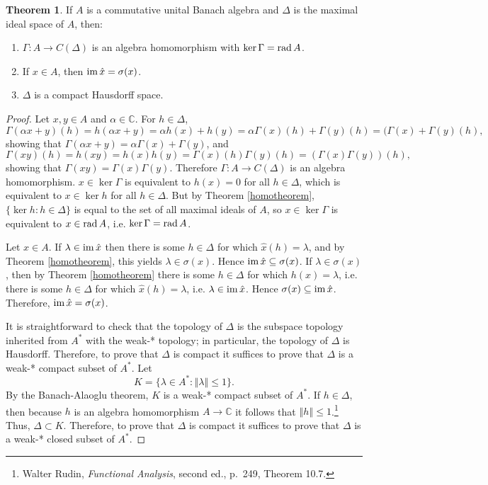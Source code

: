 \documentclass{article}
\newcommand{\im}{\ensuremath\mathrm{im}\,}
\newcommand{\rad}{\ensuremath\mathrm{rad}\,}
\newcommand{\norm}[1]{\left\Vert #1 \right\Vert}
\theoremstyle{definition}
\newtheorem{theorem}{Theorem}
\theoremstyle{definition}
\begin{document}
\begin{theorem}
If $A$ is a commutative unital Banach algebra and $\Delta$ is the maximal ideal space of $A$, then:
\begin{enumerate}
\item $\Gamma:A \to C(\Delta)$ is an algebra homomorphism with $\ker \Gamma=\rad A$.
\item If $x \in A$, then $\im \hat{x}=\sigma(x)$.
\item $\Delta$ is a compact Hausdorff space.
\end{enumerate}
\label{gelfand}
\end{theorem}
\begin{proof}
Let $x,y \in A$ and $\alpha \in \mathbb{C}$. For $h \in \Delta$,
\[
\Gamma(\alpha x+y)(h) = h(\alpha x+y) = \alpha h(x)+h(y) =\alpha \Gamma(x)(h)+\Gamma(y)(h)= (\Gamma(x)+\Gamma(y)(h),
\]
showing that $\Gamma(\alpha x+y)=\alpha\Gamma(x)+\Gamma(y)$, and
\[
\Gamma(xy)(h)=h(xy)=h(x)h(y)=\Gamma(x)(h) \Gamma(y)(h) = (\Gamma(x)\Gamma(y))(h),
\]
showing that $\Gamma(xy)=\Gamma(x)\Gamma(y)$. Therefore $\Gamma:A \to C(\Delta)$ is an algebra homomorphism.
$x \in \ker \Gamma$ is equivalent to $h(x)=0$ for all $h \in \Delta$, which is equivalent to $x \in \ker h$ for all $h \in \Delta$. But by Theorem \ref{homotheorem}, $\{\ker h: h \in \Delta\}$
is equal to the set of all maximal ideals of $A$, so $x \in \ker \Gamma$ is equivalent to $x \in \rad A$, i.e. $\ker \Gamma=\rad A$.

Let $x \in A$.
If $\lambda \in \im \hat{x}$ then there is some $h \in \Delta$ for which $\hat{x}(h)=\lambda$, and by 
Theorem \ref{homotheorem}, 
this yields $\lambda \in \sigma(x)$. Hence $\im \hat{x} \subseteq \sigma(x)$. If $\lambda \in \sigma(x)$, then by Theorem \ref{homotheorem}
there is some $h \in \Delta$ for which $h(x)=\lambda$, i.e. there is some $h \in \Delta$ for which $\hat{x}(h)=\lambda$, i.e. $\lambda \in \im \hat{x}$. Hence
$\sigma(x) \subseteq \im \hat{x}$. Therefore, $\im \hat{x} = \sigma(x)$.

It is straightforward to check that the topology of $\Delta$ is the subspace topology inherited from $A^*$ with the weak-* topology;
in particular, the topology of $\Delta$ is Hausdorff.
Therefore, to prove that $\Delta$ is compact it suffices to prove that $\Delta$ is a weak-* compact subset of $A^*$.
Let
\[
K=\{\lambda \in A^*: \norm{\lambda} \leq 1\}.
\]
By the Banach-Alaoglu theorem, $K$ is a weak-* compact subset of $A^*$. 
If $h \in \Delta$, then because $h$ is an algebra homomorphism $A \to \mathbb{C}$ it follows that $\norm{h} \leq 1$.\footnote{Walter Rudin, {\em Functional Analysis}, second ed., p.~249, Theorem 10.7.} Thus, $\Delta \subset K$. Therefore, to prove that $\Delta$ is compact it suffices to prove that $\Delta$ is a weak-*
closed subset of $A^*$.


\end{proof}
\end{document}
